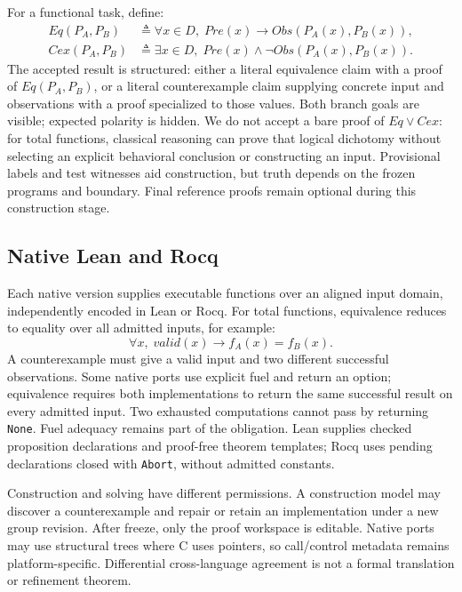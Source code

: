 \documentclass{article}
\begin{document}
For a functional task, define:
\begin{align}
  \mathit{Eq}(P_A,P_B) &\triangleq
    \forall x\in D,\;\mathit{Pre}(x)\rightarrow
    \mathit{Obs}(P_A(x),P_B(x)), \\
  \mathit{Cex}(P_A,P_B) &\triangleq
    \exists x\in D,\;\mathit{Pre}(x)\land
    \neg\mathit{Obs}(P_A(x),P_B(x)).
\end{align}
The accepted result is structured: either a literal equivalence claim with a proof of $\mathit{Eq}(P_A,P_B)$, or a literal counterexample claim supplying concrete input and observations with a proof specialized to those values. Both branch goals are visible; expected polarity is hidden. We do not accept a bare proof of $\mathit{Eq}\lor\mathit{Cex}$: for total functions, classical reasoning can prove that logical dichotomy without selecting an explicit behavioral conclusion or constructing an input. Provisional labels and test witnesses aid construction, but truth depends on the frozen programs and boundary. Final reference proofs remain optional during this construction stage.

\subsection{Native Lean and Rocq}

Each native version supplies executable functions over an aligned input domain, independently encoded in Lean or Rocq. For total functions, equivalence reduces to equality over all admitted inputs, for example:
\begin{equation}
  \forall x,\;\mathit{valid}(x)\rightarrow f_A(x)=f_B(x).
\end{equation}
A counterexample must give a valid input and two different successful observations. Some native ports use explicit fuel and return an option; equivalence requires both implementations to return the same successful result on every admitted input. Two exhausted computations cannot pass by returning \texttt{None}. Fuel adequacy remains part of the obligation. Lean supplies checked proposition declarations and proof-free theorem templates; Rocq uses pending declarations closed with \texttt{Abort}, without admitted constants.

Construction and solving have different permissions. A construction model may discover a counterexample and repair or retain an implementation under a new group revision. After freeze, only the proof workspace is editable. Native ports may use structural trees where C uses pointers, so call/control metadata remains platform-specific. Differential cross-language agreement is not a formal translation or refinement theorem.
\end{document}

